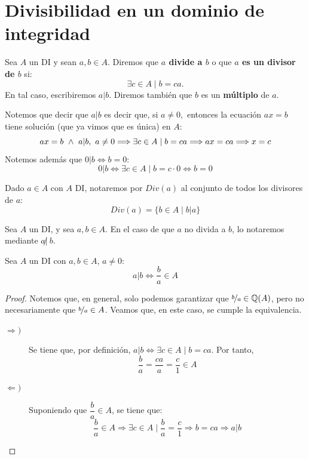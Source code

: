 \section{Divisibilidad en un dominio de integridad}
\begin{definicion}[Divisor]
    Sea $A$ un DI y sean $a,b \in A$. Diremos que \textbf{$a$ divide a $b$} o que \textbf{$a$ es un divisor de $b$} si:
    $$\exists c \in A \mid b = ca.$$
    En tal caso, escribiremos $a|b$. Diremos también que $b$ es un \textbf{múltiplo} de $a$.
\end{definicion}

Notemos que decir que $a|b$ es decir que, si $a \neq 0,$ entonces la ecuación $ax=b$ tiene solución (que ya vimos que es única) en $A$:
$$ax = b \ \land \  a|b,~a\neq 0 \Longrightarrow \exists c \in A \mid b = ca \Longrightarrow ax=ca \Longrightarrow x=c$$
Notemos además que $0|b \Longleftrightarrow b=0$:
$$0|b \Longleftrightarrow \exists c \in A \mid b = c \cdot 0 \Longleftrightarrow b=0$$

\begin{notacion}
    Dado $a \in A$ con $A$ DI, notaremos por $Div(a)$ al conjunto de todos los divisores de $a$:
    $$Div(a) = \{b \in A \mid b|a \}$$
\end{notacion}

\begin{notacion}
    Sea $A$ un DI, y sea $a,b\in A$. En el caso de que $a$ no divida a $b$, lo notaremos mediante $a\not|~b$.
\end{notacion}

\begin{lema}
    Sea $A$ un DI con $a,b \in A$, $a \neq 0$:
    $$a|b \Longleftrightarrow \dfrac{b}{a} \in A$$
\end{lema} 
\begin{proof} Notemos que, en general, solo podemos garantizar que $\nicefrac{b}{a} \in \mathbb Q(A)$, pero no necesariamente que $\nicefrac{b}{a} \in A$. Veamos que, en este caso, se cumple la equivalencia.
\begin{description}
    \item[$\Longrightarrow)$] Se tiene que, por definición, $a|b \Longleftrightarrow \exists c \in A \mid b = ca$. Por tanto,
    $$\dfrac{b}{a} = \dfrac{ca}{a} = \dfrac{c}{1} \in A$$
    \item[$\Longleftarrow)$] Suponiendo que $\dfrac{b}{a} \in A$, se tiene que:
    $$\dfrac{b}{a} \in A \Longrightarrow \exists c \in A \mid \dfrac{b}{a} = \dfrac{c}{1} \Longrightarrow b = ca \Longrightarrow a|b$$
\end{description}
\end{proof}

